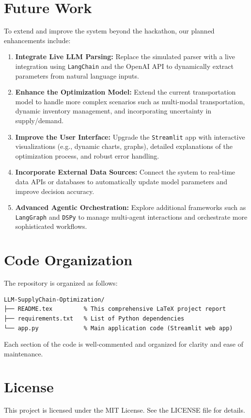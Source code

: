 \documentclass[11pt]{article}
\begin{document}
\section{Future Work}
To extend and improve the system beyond the hackathon, our planned enhancements include:
\begin{enumerate}[label=\arabic*.]
    \item \textbf{Integrate Live LLM Parsing:}  
    Replace the simulated parser with a live integration using \texttt{LangChain} and the OpenAI API to dynamically extract parameters from natural language inputs.
    
    \item \textbf{Enhance the Optimization Model:}  
    Extend the current transportation model to handle more complex scenarios such as multi-modal transportation, dynamic inventory management, and incorporating uncertainty in supply/demand.
    
    \item \textbf{Improve the User Interface:}  
    Upgrade the \texttt{Streamlit} app with interactive visualizations (e.g., dynamic charts, graphs), detailed explanations of the optimization process, and robust error handling.
    
    \item \textbf{Incorporate External Data Sources:}  
    Connect the system to real-time data APIs or databases to automatically update model parameters and improve decision accuracy.
    
    \item \textbf{Advanced Agentic Orchestration:}  
    Explore additional frameworks such as \texttt{LangGraph} and \texttt{DSPy} to manage multi-agent interactions and orchestrate more sophisticated workflows.
\end{enumerate}

\section{Code Organization}
The repository is organized as follows:
\begin{verbatim}
LLM-SupplyChain-Optimization/
├── README.tex         % This comprehensive LaTeX project report
├── requirements.txt   % List of Python dependencies
└── app.py             % Main application code (Streamlit web app)
\end{verbatim}
Each section of the code is well-commented and organized for clarity and ease of maintenance.

\section{License}
This project is licensed under the MIT License. See the LICENSE file for details.
\end{document}
